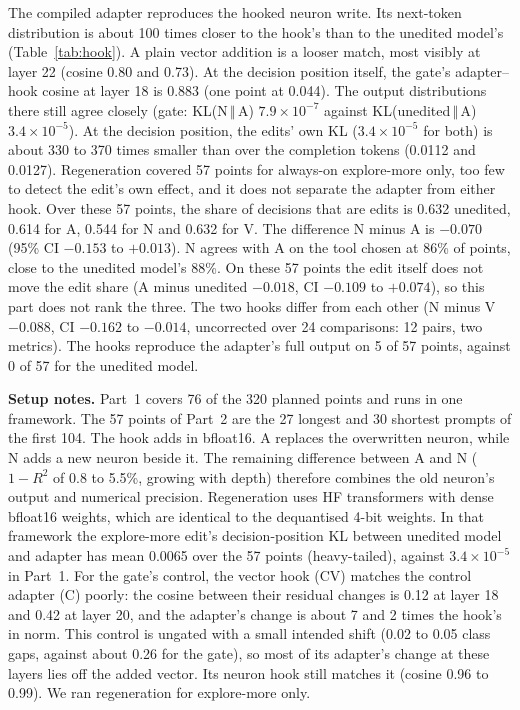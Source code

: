 The compiled adapter reproduces the hooked neuron write. Its next-token distribution is about 100 times closer to the hook's than to the unedited model's (Table~\ref{tab:hook}). A plain vector addition is a looser match, most visibly at layer 22 (cosine 0.80 and 0.73). At the decision position itself, the gate's adapter--hook cosine at layer 18 is 0.883 (one point at 0.044). The output distributions there still agree closely (gate: KL(N$\,\Vert\,$A) $7.9\times10^{-7}$ against KL(unedited$\,\Vert\,$A) $3.4\times10^{-5}$). At the decision position, the edits' own KL ($3.4\times10^{-5}$ for both) is about 330 to 370 times smaller than over the completion tokens (0.0112 and 0.0127). Regeneration covered 57 points for always-on explore-more only, too few to detect the edit's own effect, and it does not separate the adapter from either hook. Over these 57 points, the share of decisions that are edits is 0.632 unedited, 0.614 for A, 0.544 for N and 0.632 for V. The difference N minus A is $-0.070$ (95\% CI $-0.153$ to $+0.013$). N agrees with A on the tool chosen at 86\% of points, close to the unedited model's 88\%. On these 57 points the edit itself does not move the edit share (A minus unedited $-0.018$, CI $-0.109$ to $+0.074$), so this part does not rank the three. The two hooks differ from each other (N minus V $-0.088$, CI $-0.162$ to $-0.014$, uncorrected over 24 comparisons: 12 pairs, two metrics). The hooks reproduce the adapter's full output on 5 of 57 points, against 0 of 57 for the unedited model.

\textbf{Setup notes.} Part~1 covers 76 of the 320 planned points and runs in one framework. The 57 points of Part~2 are the 27 longest and 30 shortest prompts of the first 104. The hook adds in bfloat16. A replaces the overwritten neuron, while N adds a new neuron beside it. The remaining difference between A and N ($1 - R^2$ of 0.8 to 5.5\%, growing with depth) therefore combines the old neuron's output and numerical precision. Regeneration uses HF transformers with dense bfloat16 weights, which are identical to the dequantised 4-bit weights. In that framework the explore-more edit's decision-position KL between unedited model and adapter has mean 0.0065 over the 57 points (heavy-tailed), against $3.4\times10^{-5}$ in Part~1. For the gate's control, the vector hook (CV) matches the control adapter (C) poorly: the cosine between their residual changes is 0.12 at layer 18 and 0.42 at layer 20, and the adapter's change is about 7 and 2 times the hook's in norm. This control is ungated with a small intended shift (0.02 to 0.05 class gaps, against about 0.26 for the gate), so most of its adapter's change at these layers lies off the added vector. Its neuron hook still matches it (cosine 0.96 to 0.99). We ran regeneration for explore-more only.

